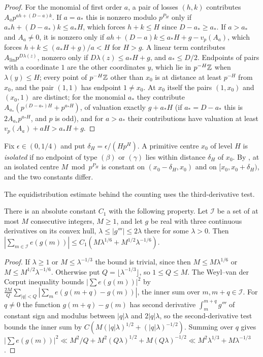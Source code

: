 \documentclass[11pt]{article}
\begin{document}
\begin{proof}
For the monomial of first order $a$, a pair of losses $(h,k)$ contributes $A_ap^{ah+(D-a)k}$. If $a=a_*$
this is nonzero modulo $p^{P_H}$ only if $a_*h+(D-a_*)k\le a_*H$, which forces $h+k\le H$ since
$D-a_*\ge a_*$. If $a>a_*$ and $A_a\ne0$, it is nonzero only if $ah+(D-a)k\le a_*H+g-v_p(A_a)$, which
forces $h+k\le(a_*H+g)/a<H$ for $H>g$. A linear term contributes $A_{\mathrm{lin}}p^{D\lambda(z)}$, nonzero
only if $D\lambda(z)\le a_*H+g$, and $a_*\le D/2$. Endpoints of pairs with a coordinate $1$ are the other
coordinates $y$, which lie in $p^{-H}\mathbb Z$ when $\lambda(y)\le H$; every point of $p^{-H}\mathbb Z$ other than
$x_0$ is at distance at least $p^{-H}$ from $x_0$, and the pair $(1,1)$ has endpoint $1\ne x_0$. At $x_0$
itself the pairs $(1,x_0)$ and $(x_0,1)$ are distinct; for the monomial $a_*$ they contribute
$A_{a_*}(p^{(D-a_*)H}+p^{a_*H})$, of valuation exactly $g+a_*H$ (if $a_*=D-a_*$ this is
$2A_{a_*}p^{a_*H}$, and $p$ is odd), and for $a>a_*$ their contributions have valuation at least
$v_p(A_a)+aH>a_*H+g$.
\end{proof}

Fix $\epsilon\in(0,1/4)$ and put $\delta_H=\epsilon/(Hp^H)$. A primitive centre $x_0$ of level $H$ is
\emph{isolated} if no endpoint of type $(\beta)$ or $(\gamma)$ lies within distance $\delta_H$ of $x_0$.
By , at an isolated centre $M\bmod p^{P_H}$ is constant on $(x_0-\delta_H,x_0)$ and on
$[x_0,x_0+\delta_H)$, and the two constants differ.

The equidistribution estimate behind the counting uses the third-derivative test.

\begin{lemma}\label{lem:third}
There is an absolute constant $C_1$ with the following property. Let $\mathcal I$ be a set of at most $M$
consecutive integers, $M\ge1$, and let $g$ be real with three continuous derivatives on its convex hull,
$\lambda\le|g'''|\le2\lambda$ there for some $\lambda>0$. Then
$|\sum_{m\in\mathcal I}e(g(m))|\le C_1(M\lambda^{1/6}+M^{1/2}\lambda^{-1/6})$.
\end{lemma}

\begin{proof}
If $\lambda\ge1$ or $M\le\lambda^{-1/3}$ the bound is trivial, since then $M\le M\lambda^{1/6}$ or
$M\le M^{1/2}\lambda^{-1/6}$. Otherwise put $Q=\lfloor\lambda^{-1/3}\rfloor$, so $1\le Q\le M$. The
Weyl--van der Corput inequality \cite[Lemma~2.5 and (2.3.2), p.~10]{GK91} bounds $|\sum e(g(m))|^2$ by
$\frac{2M}{Q}\sum_{|q|<Q}|\sum_me(g(m+q)-g(m))|$, the inner sum over $m,m+q\in\mathcal I$. For $q\ne0$ the
function $g(m+q)-g(m)$ has second derivative $\int_m^{m+q}g'''$ of constant sign and modulus between
$|q|\lambda$ and $2|q|\lambda$, so the second-derivative test \cite[Theorem~2.2, p.~8]{GK91} bounds the inner sum
by $C(M(|q|\lambda)^{1/2}+(|q|\lambda)^{-1/2})$. Summing over $q$ gives
$|\sum e(g(m))|^2\ll M^2/Q+M^2(Q\lambda)^{1/2}+M(Q\lambda)^{-1/2}\ll M^2\lambda^{1/3}+M\lambda^{-1/3}$.
\end{proof}
\end{document}
